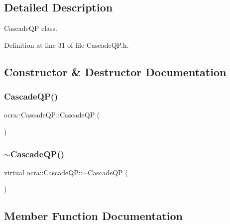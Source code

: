 \subsection{Detailed Description}
Cascade\+QP class. 

Definition at line 31 of file Cascade\+Q\+P.\+h.



\subsection{Constructor \& Destructor Documentation}
\hypertarget{classocra_1_1CascadeQP_a545a3098762becf8a663eb8ab3bd4899}{}\label{classocra_1_1CascadeQP_a545a3098762becf8a663eb8ab3bd4899} 
\subsubsection{\texorpdfstring{Cascade\+Q\+P()}{CascadeQP()}}
{\footnotesize\ttfamily ocra\+::\+Cascade\+Q\+P\+::\+Cascade\+QP (\begin{DoxyParamCaption}{ }\end{DoxyParamCaption})}

\hypertarget{classocra_1_1CascadeQP_a843673d4951f7a8e972598d0f361ad8d}{}\label{classocra_1_1CascadeQP_a843673d4951f7a8e972598d0f361ad8d} 
\subsubsection{\texorpdfstring{$\sim$\+Cascade\+Q\+P()}{~CascadeQP()}}
{\footnotesize\ttfamily virtual ocra\+::\+Cascade\+Q\+P\+::$\sim$\+Cascade\+QP (\begin{DoxyParamCaption}{ }\end{DoxyParamCaption})\hspace{0.3cm}{\ttfamily [virtual]}}



\subsection{Member Function Documentation}
\hypertarget{classocra_1_1CascadeQP_ab1ac4edfcf8e8c7567fc0a5ca5bd5f86}{}\label{classocra_1_1CascadeQP_ab1ac4edfcf8e8c7567fc0a5ca5bd5f86} 
